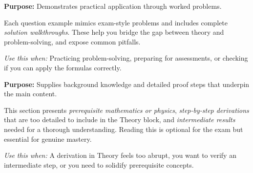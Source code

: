 \bigskip

\noindent
\begin{minipage}{0.9\textwidth}
  \begin{tcolorbox}[breakable, colback=GreenBG, colframe=ForestGreen,
                     arc=3pt,
                     before upper={\textcolor{ForestGreen}{\textbf{\scshape Question Examples}}\par\smallskip}]
    \textbf{Purpose:} Demonstrates practical application through worked problems.

    Each question example mimics exam-style problems and includes complete
    \emph{solution walkthroughs}. These help you bridge the gap between theory
    and problem-solving, and expose common pitfalls.

    \smallskip
    \textit{Use this when:} Practicing problem-solving, preparing for assessments,
    or checking if you can apply the formulas correctly.
  \end{tcolorbox}
\end{minipage}

\bigskip

\noindent
\begin{minipage}{0.9\textwidth}
  \begin{tcolorbox}[breakable, colback=PurpleBG, colframe=AmethystPurple,
                     leftrule=4pt, arc=0pt,
                     before upper={\textcolor{AmethystPurple}{\textbf{\scshape Foundation}}\par\smallskip}]
    \textbf{Purpose:} Supplies background knowledge and detailed proof steps
    that underpin the main content.

    This section presents \emph{prerequisite mathematics or physics},
    \emph{step-by-step derivations} that are too detailed to include in the Theory block,
    and \emph{intermediate results} needed for a thorough understanding.
    Reading this is optional for the exam but essential for genuine mastery.

    \smallskip
    \textit{Use this when:} A derivation in Theory feels too abrupt, you want to verify
    an intermediate step, or you need to solidify prerequisite concepts.
  \end{tcolorbox}
\end{minipage}

\bigskip

